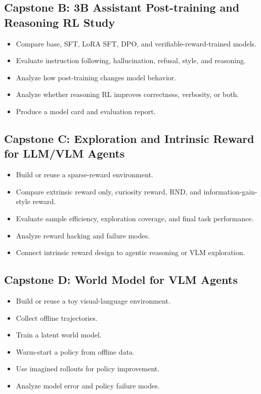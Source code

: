 \documentclass[11pt]{article}
\begin{document}
\subsection*{Capstone B: 3B Assistant Post-training and Reasoning RL Study}

\begin{itemize}
    \item Compare base, SFT, LoRA SFT, DPO, and verifiable-reward-trained models.
    \item Evaluate instruction following, hallucination, refusal, style, and reasoning.
    \item Analyze how post-training changes model behavior.
    \item Analyze whether reasoning RL improves correctness, verbosity, or both.
    \item Produce a model card and evaluation report.
\end{itemize}

\subsection*{Capstone C: Exploration and Intrinsic Reward for LLM/VLM Agents}

\begin{itemize}
    \item Build or reuse a sparse-reward environment.
    \item Compare extrinsic reward only, curiosity reward, RND, and information-gain-style reward.
    \item Evaluate sample efficiency, exploration coverage, and final task performance.
    \item Analyze reward hacking and failure modes.
    \item Connect intrinsic reward design to agentic reasoning or VLM exploration.
\end{itemize}

\subsection*{Capstone D: World Model for VLM Agents}

\begin{itemize}
    \item Build or reuse a toy visual-language environment.
    \item Collect offline trajectories.
    \item Train a latent world model.
    \item Warm-start a policy from offline data.
    \item Use imagined rollouts for policy improvement.
    \item Analyze model error and policy failure modes.
\end{itemize}
\end{document}
